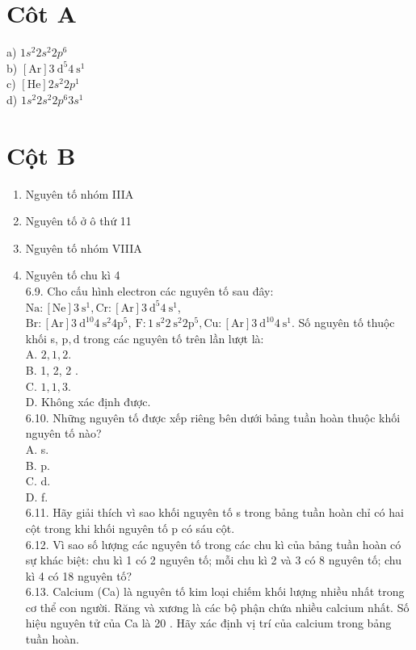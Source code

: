 \documentclass[10pt]{article}
\begin{document}
\section*{Côt $\mathbf{A}$}
a) $1 s^{2} 2 s^{2} 2 p^{6}$\\
b) $[\mathrm{Ar}] 3 \mathrm{~d}^{5} 4 \mathrm{~s}^{1}$\\
c) $[\mathrm{He}] 2 s^{2} 2 p^{1}$\\
d) $1 s^{2} 2 s^{2} 2 p^{6} 3 s^{1}$

\section*{Cột B}
\begin{enumerate}
  \item Nguyên tố nhóm IIIA
  \item Nguyên tố ở ô thứ 11
  \item Nguyên tố nhóm VIIIA
  \item Nguyên tố chu kì 4\\
6.9. Cho cấu hình electron các nguyên tố sau đây: $\mathrm{Na}:[\mathrm{Ne}] 3 \mathrm{~s}^{1}, \mathrm{Cr}:[\mathrm{Ar}] 3 \mathrm{~d}^{5} 4 \mathrm{~s}^{1}$, $\mathrm{Br}:[\mathrm{Ar}] 3 \mathrm{~d}^{10} 4 \mathrm{~s}^{2} 4 \mathrm{p}^{5}, \mathrm{~F}: 1 \mathrm{~s}^{2} 2 \mathrm{~s}^{2} 2 \mathrm{p}^{5}, \mathrm{Cu}:[\mathrm{Ar}] 3 \mathrm{~d}^{10} 4 \mathrm{~s}^{1}$. Số nguyên tố thuộc khối s, $\mathrm{p}, \mathrm{d}$ trong các nguyên tố trên lần lượt là:\\
A. $2,1,2$.\\
B. 1, 2, 2 .\\
C. $1,1,3$.\\
D. Không xác định được.\\
6.10. Những nguyên tố được xếp riêng bên dưới bảng tuần hoàn thuộc khối nguyên tố nào?\\
A. s.\\
B. p.\\
C. d.\\
D. f.\\
6.11. Hãy giải thích vì sao khối nguyên tố s trong bảng tuần hoàn chỉ có hai cột trong khi khối nguyên tố p có sáu cột.\\
6.12. Vì sao số lượng các nguyên tố trong các chu kì của bảng tuần hoàn có sự khác biệt: chu kì 1 có 2 nguyên tố; mỗi chu kì 2 và 3 có 8 nguyên tố; chu kì 4 có 18 nguyên tố?\\
6.13. Calcium (Ca) là nguyên tố kim loại chiếm khối lượng nhiều nhất trong cơ thể con người. Răng và xương là các bộ phận chứa nhiều calcium nhất. Số hiệu nguyên tử của Ca là 20 . Hãy xác định vị trí của calcium trong bảng tuần hoàn.\\

\end{enumerate}
\end{document}
